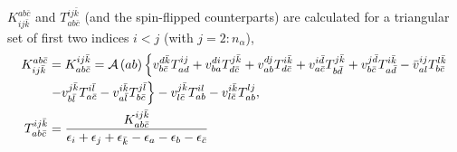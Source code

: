 \documentclass[a4paper,12pt,oneside]{book}
\newcommand{\asop}[1]{{\cal A}\left(#1\right)}
\newcommand{\spa}[1]{{#1}}
\newcommand{\spb}[1]{\bar{#1}}
\begin{document}
$K^{\spa{a}\spa{b}\spb{c}}_{\spa{i}\spa{j}\spb{k}}$ and $T_{\spa{a}\spa{b}\spb{c}}^{\spa{i}\spa{j}\spb{k}}$ (and the spin-flipped counterparts) 
are calculated for a triangular set of first two indices $\spa{i}\lt \spa{j}$ 
(with $\spa{j}=2:n_\alpha$),
\begin{equation}
\begin{aligned}
K^{\spa{a}\spa{b}\spb{c}}_{\spa{i}\spa{j}\spb{k}} &= K_{\spa{a}\spa{b}\spb{c}}^{\spa{i}\spa{j}\spb{k}}
= \asop{\spa{a}\spa{b}} \left\{ 
  v_{\spa{b}\spb{c}}^{\spa{d}\spb{k}} T^{\spa{i}\spa{j}}_{\spa{a}\spa{d}}
+ v_{\spa{b}\spa{a}}^{\spa{d}\spa{i}} T^{\spa{j}\spb{k}}_{\spa{d}\spb{c}}
+ v_{\spa{a}\spa{b}}^{\spa{d}\spa{j}} T^{\spa{i}\spb{k}}_{\spa{d}\spb{c}}
+ v_{\spa{a}\spb{c}}^{\spa{i}\spb{d}} T^{\spa{j}\spb{k}}_{\spa{b}\spb{d}}
+ v_{\spa{b}\spb{c}}^{\spa{j}\spb{d}} T^{\spa{i}\spb{k}}_{\spa{a}\spb{d}}
- \bar v_{\spa{a}\spa{l}}^{\spa{i}\spa{j}} T^{\spa{l}\spb{k}}_{\spa{b}\spb{c}}
\right.\\
&\left.
- v_{\spa{b}\spb{l}}^{\spa{j}\spb{k}} T^{\spa{i}\spb{l}}_{\spa{a}\spb{c}}
- v_{\spa{a}\spb{l}}^{\spa{i}\spb{k}} T^{\spa{j}\spb{l}}_{\spa{b}\spb{c}}
\right\}
- v_{\spa{l}\spb{c}}^{\spa{j}\spb{k}} T^{\spa{i}\spa{l}}_{\spa{a}\spa{b}}
- v_{\spa{l}\spb{c}}^{\spa{i}\spb{k}} T^{\spa{l}\spa{j}}_{\spa{a}\spa{b}}
,\\
T_{\spa{a}\spa{b}\spb{c}}^{\spa{i}\spa{j}\spb{k}} &= 
\frac{K_{\spa{a}\spa{b}\spb{c}}^{\spa{i}\spa{j}\spb{k}}}
{\epsilon_{\spa{i}} +\epsilon_{\spa{j}} +\epsilon_{\spb{k}} -\epsilon_{\spa{a}} -\epsilon_{\spa{b}} -\epsilon_{\spb{c}}}
\end{aligned}
\end{equation}
\end{document}
